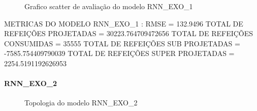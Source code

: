 \documentclass[	12pt, Times, openright, twoside, a4paper, english, brazil]{abntex2}
\begin{document}
                \begin{figure}[!ht]
                  \caption{Grafico scatter de avaliação do modelo RNN\_EXO\_1 \label{fig:case1_rnn_exo_1_val_scatter} }
                \end{figure}
                METRICAS DO MODELO RNN\_EXO\_1 : \newline
                RMSE = 132.9496\newline
                TOTAL DE REFEIÇÕES PROJETADAS = 30223.764709472656\newline
                TOTAL DE REFEIÇÕES CONSUMIDAS = 35555\newline
                TOTAL DE REFEIÇÕES SUB PROJETADAS = -7585.754409790039\newline
                TOTAL DE REFEIÇÕES SUPER PROJETADAS = 2254.5191192626953\newline

              \paragraph{RNN\_EXO\_2}
                \begin{figure}[!ht]
                  \caption{Topologia do modelo RNN\_EXO\_2 \label{fig:case1_rnn_exo_2} }
                \end{figure}
\end{document}
